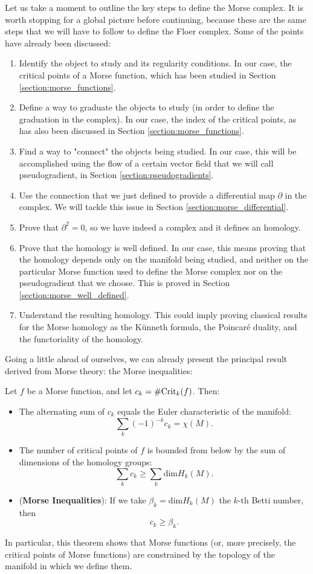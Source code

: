 Let us take a moment to outline the key steps to define the Morse complex. It is worth stopping for a global picture before continuing, because these are the same steps that we will have to follow to define the Floer complex. Some of the points have already been discussed:

\begin{enumerate}
\item Identify the object to study and its regularity conditions. In our case, the critical points of a Morse function, which has been studied in Section \ref{section:morse_functions}.
\item Define a way to graduate the objects to study (in order to define the graduation in the complex). In our case, the index of the critical points, as has also been discussed in Section \ref{section:morse_functions}.
\item Find a way to "connect" the objects being studied. In our case, this will be accomplished using the flow of a certain vector field that we will call pseudogradient, in Section \ref{section:pseudogradients}.
\item Use the connection that we just defined to provide a differential map $\partial$ in the complex. We will tackle this issue in Section \ref{section:morse_differential}.
\item Prove that $\partial^2 = 0$, so we have indeed a complex and it defines an homology.
\item Prove that the homology is well defined. In our case, this means proving that the homology depends only on the manifold being studied, and neither on the particular Morse function used to define the Morse complex nor on the pseudogradient that we choose. This is proved in Section \ref{section:morse_well_defined}.
\item Understand the resulting homology. This could imply proving classical results for the Morse homology as the Künneth formula, the Poincaré duality, and the functoriality of the homology.
\end{enumerate}

Going a little ahead of ourselves, we can already present the principal result derived from Morse theory: the Morse inequalities:

\begin{theo} Let $f$ be a Morse function, and let $c_k = \# \mathrm{Crit}_k(f)$. Then:

\begin{itemize}
	\item The alternating sum of $c_k$ equals the Euler characteristic of the manifold:
	\[\sum_k (-1)^{-k}c_k = \chi(M) .\]
	\item The number of critical points of $f$ is bounded from below by the sum of dimensions of the homology groups:
	\[\sum_k c_k \geq \sum_k \mathrm{dim} H_k(M) .\]
	\item ({\bf Morse Inequalities}): If we take $\beta_k = \mathrm{dim} H_k(M)$ the $k$-th Betti number, then
	\[c_k \geq \beta_k .\]
\end{itemize}
\end{theo}

In particular, this theorem shows that Morse functions (or, more precisely, the critical points of Morse functions) are constrained by the topology of the manifold in which we define them.
